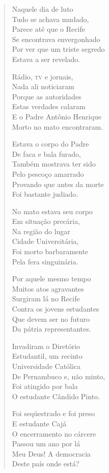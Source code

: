\begin{verse}
Naquele dia de luto\\
Tudo se achava mudado,\\
Parece até que o Recife\\
Se encontrava envergonhado\\
Por ver que um triste segredo\\
Estava a ser revelado.

Rádio, \textsc{tv} e jornais,\\
Nada ali noticiaram\\
Porque as autoridades\\
Estas verdades calaram\\
E o Padre Antônio Henrique\\
Morto no mato encontraram.

Estava o corpo do Padre\\
De faca e bala furado,\\
Também mostrava ter sido\\
Pelo pescoço amarrado\\
Provando que antes da morte\\
Foi bastante judiado.

No mato estava seu corpo\\
Em situação precária,\\
Na região do lugar\\
Cidade Universitária,\\
Foi morto barbaramente\\
Pela fera singuinária.

Por aquele mesmo tempo\\
Muitos atos agravantes\\
Surgiram lá no Recife\\
Contra os jovens estudantes\\
Que devem ser no futuro\\
Da pátria representantes.


Invadiram o Diretório\\
Estudantil, um recinto\\
Universidade Católica\\
De Pernambuco e, não minto,\\
Foi atingido por bala\\
O estudante Cândido Pinto.

Foi seqüestrado e foi preso\\
E estudante Cajá\\
O encerramento no cárcere\\
Passou um ano por lá\\
Meu Deus! A democracia\\
Deste país onde está?


\end{verse}
